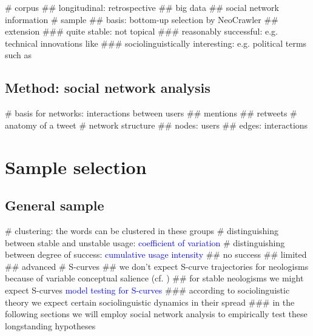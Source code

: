 \documentclass[
  a4paper,
  ]{scrartcl}
\newcommand{\mtrc}[1]{\textcolor{blue}{#1}}
\begin{document}
    \begin{easylist}[itemize]
      # corpus
        ## longitudinal: retrospective
        ## big data
        ## social network information
      # sample
        ## basis: bottom-up selection by NeoCrawler \parencite{Kerremans2018}
        ## extension
          ### quite stable: not topical
          ### reasonably successful: e.g. technical innovations like 
          ### sociolinguistically interesting: e.g. political terms such as 
    \end{easylist}

  \subsection{Method: social network analysis}

    \begin{easylist}[itemize]
      # basis for networks: interactions between users
        ## mentions
        ## retweets
      # anatomy of a tweet
      # network structure
        ## nodes: users
        ## edges: interactions
    \end{easylist}

\section{Sample selection}

  \subsection{General sample}

    \begin{easylist}[itemize]
      # clustering: the words can be clustered in these groups \parencite{Kerremans2015}
      # distinguishing between stable and unstable usage: \mtrc{coefficient of variation}
      # distinguishing between degree of success: \mtrc{cumulative usage intensity}
        ## no success
        ## limited
        ## advanced
    # S-curves
      ## we don't expect S-curve trajectories for  neologisms because of variable conceptual salience (cf. \cite{Nini2017})
      ## for stable neologisms we might expect S-curves \mtrc{model testing for S-curves}
        ### according to sociolinguistic theory we expect certain sociolinguistic dynamics in their spread
        ### in the following sections we will employ social network analysis to empirically test these longstanding hypotheses
    \end{easylist}
\end{document}
